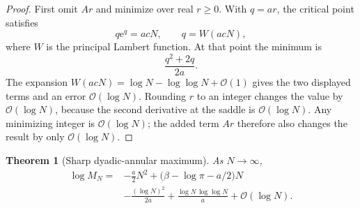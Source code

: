 \documentclass[11pt,oneside]{article}
\newtheorem{theorem}{Theorem}[section]
\theoremstyle{definition}
\theoremstyle{remark}
\newcommand{\e}{\mathrm e}
\newcommand{\bigO}{\mathcal O}
\begin{document}
\begin{proof}
First omit $Ar$ and minimize over real $r\ge0$.  With $q=ar$, the critical
point satisfies
\[
 q\e^q=acN,
 \qquad q=W(acN),
\]
where $W$ is the principal Lambert function.  At that point the minimum is
\[
 \frac{q^2+2q}{2a}.
\]
The expansion $W(acN)=\log N-\log\log N+\bigO(1)$ gives the two displayed
terms and an error $\bigO(\log N)$.  Rounding $r$ to an integer changes the
value by $\bigO(\log N)$, because the second derivative at the saddle is
$\bigO(\log N)$.  Any minimizing integer is $\bigO(\log N)$; the added term
$Ar$ therefore also changes the result by only $\bigO(\log N)$.
\end{proof}

\begin{theorem}[Sharp dyadic-annular maximum]
As $N\to\infty$,
\begin{equation}
 \boxed{\begin{aligned}
 \log M_N={}&-\frac a2N^2
 +\bigl(\beta-\log\pi-a/2\bigr)N\\
 &-\frac{(\log N)^2}{2a}
 +\frac{\log N\,\log\log N}{a}
 +\bigO(\log N).
 \end{aligned}}                                             \label{eq:MN-sharp}
\end{equation}
\end{theorem}
\end{document}
